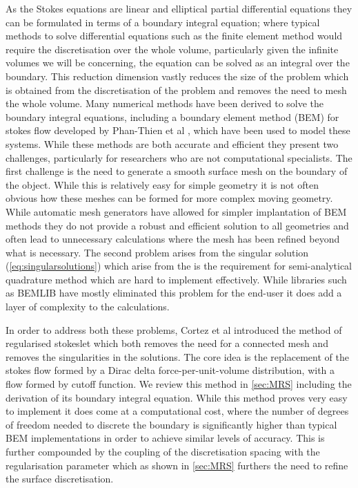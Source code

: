 As the Stokes equations are linear and elliptical partial differential equations they can be formulated in terms of a boundary integral equation; where typical methods to solve differential equations such as the finite element method would require the discretisation over the whole volume, particularly given the infinite volumes we will be concerning, the equation can be solved as an integral over the boundary. This reduction dimension vastly reduces the size of the problem which is obtained from the discretisation of the problem and removes the need to mesh the whole volume. Many numerical methods have been derived to solve the boundary integral equations, including a boundary element method (BEM) for stokes flow developed by Phan-Thien et al \cite{Tran-Cong1987APropulsion}, which have been used to model these systems. While these methods are both accurate and efficient they present two challenges, particularly for researchers who are not computational specialists. The first challenge is the need to generate a smooth surface mesh on the boundary of the object. While this is relatively easy for simple geometry it is not often obvious how these meshes can be formed for more complex moving geometry. While automatic mesh generators have allowed for simpler implantation of BEM methods they do not provide a robust and efficient solution to all geometries and often lead to unnecessary calculations where the mesh has been refined  beyond what is necessary. The second problem arises from the singular solution (\cref{eq:singularsolutions}) which arise from the is the requirement for semi-analytical quadrature method which are hard to implement effectively. While libraries such as BEMLIB \cite{BEMLIB} have mostly eliminated this problem for the end-user it does add a layer of complexity to the calculations.

In order to address both these problems, Cortez et al \cite{Cortez2001,Cortez2005} introduced the method of regularised stokeslet which both removes the need for a connected mesh and removes the singularities in the solutions. The core idea is the replacement of the stokes flow formed by a Dirac delta force-per-unit-volume distribution, with a flow formed by cutoff function. We review this method in \cref{sec:MRS} including the derivation of its boundary integral equation. While this method proves very easy to implement it does come at a computational cost, where the number of degrees of freedom needed to discrete the boundary is significantly higher than typical BEM implementations in order to achieve similar levels of accuracy. This is further compounded by the coupling of the discretisation spacing with the regularisation parameter which as shown in \cref{sec:MRS} furthers the need to refine the surface discretisation. 

